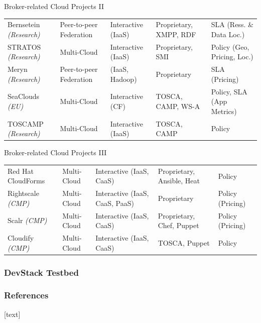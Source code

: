 \documentclass{beamer}
\newcommand{\ra}[1]{\renewcommand{\arraystretch}{#1}}
\begin{document}
\begin{frame}{Broker-related Cloud Projects II}
\ra{1.3}%
%
\begin{tabularx}{\textwidth}{LLLLL}%
	Bernsetein \emph{(Research)}  & Peer-to-peer Federation & Interactive (IaaS) & Proprietary, XMPP, RDF & SLA (Ress. \& Data Loc.)\\%
	STRATOS \emph{(Research)} & Multi-Cloud & Interactive (IaaS) & Proprietary, SMI  & Policy (Geo, Pricing, Loc.)\\%
	Meryn \emph{(Research)} & Peer-to-peer Federation & (IaaS, Hadoop) & Proprietary  & SLA (Pricing) \\%
	SeaClouds \newline \emph{(EU)} & Multi-Cloud & Interactive (CF) & TOSCA, CAMP, WS-A & Policy, SLA (App Metrics)\\%
	TOSCAMP \emph{(Research)} & Multi-Cloud & Interactive (IaaS) & TOSCA, CAMP & Policy\\%
\end{tabularx}
\end{frame}


\begin{frame}{Broker-related Cloud Projects III}
	\ra{1.3}%
%
\begin{tabularx}{\textwidth}{LLLLL}%
	Red Hat CloudForms & Multi-Cloud & Interactive (IaaS, CaaS) & Proprietary, Ansible, Heat & Policy\\%
	Rightscale \newline \emph{(CMP)} & Multi-Cloud & Interactive (IaaS, CaaS, PaaS) & Proprietary & Policy (Pricing) \\%
	Scalr \newline \emph{(CMP)} & Multi-Cloud & Interactive (IaaS, CaaS) & Proprietary, Chef, Puppet & Policy (Pricing)\\%
	Cloudify \newline \emph{(CMP)} & Multi-Cloud  & Interactive (IaaS, CaaS)& TOSCA, Puppet & Policy\\%
	\bottomrule%
\end{tabularx}
\end{frame}


\begin{frame}
\frametitle{DevStack Testbed}
\begin{figure}[ht]
	\centering
	\begin{subfigure}[b]{0.45\textwidth}
		\def\svgwidth{\linewidth}
		{\tiny \textsf{
				}}
	\end{subfigure}\qquad
	\begin{subfigure}[b]{0.45\textwidth}
		\def\svgwidth{\linewidth}
		{\tiny \textsf{
				}}
	\end{subfigure}
\end{figure}
\end{frame}


\begin{frame}[allowframebreaks]
\frametitle{References}
[text]
\printbibliography
\end{frame}
\end{document}
